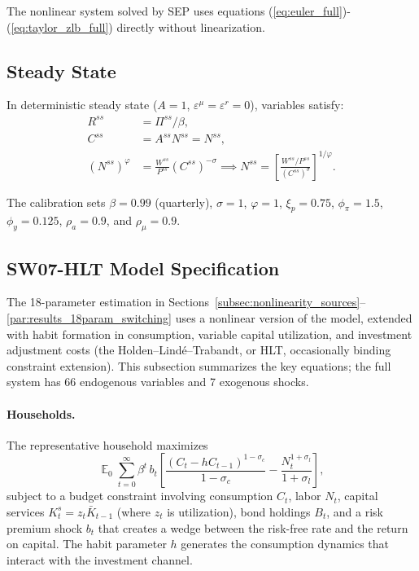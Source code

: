 \documentclass[12pt]{article}
\theoremstyle{plain}
\theoremstyle{definition}
\theoremstyle{remark}
\DeclareMathOperator{\E}{\mathbb{E}}
\newcommand{\eps}{\varepsilon}
\begin{document}
The nonlinear system solved by SEP uses equations (\ref{eq:euler_full})-(\ref{eq:taylor_zlb_full}) directly without linearization.


\subsection{Steady State}

In deterministic steady state ($A=1$, $\eps^\mu=\eps^r=0$), variables satisfy:
\begin{align}
R^{ss} &= \Pi^{ss}/\beta, \\
C^{ss} &= A^{ss} N^{ss} = N^{ss}, \\
(N^{ss})^\varphi &= \frac{W^{ss}}{P^{ss}} (C^{ss})^{-\sigma} \implies N^{ss} = \left[\frac{W^{ss}/P^{ss}}{(C^{ss})^{\sigma}}\right]^{1/\varphi}.
\end{align}

The calibration sets $\beta = 0.99$ (quarterly), $\sigma=1$, $\varphi=1$, $\xi_p=0.75$, $\phi_\pi=1.5$, $\phi_y=0.125$, $\rho_a=0.9$, and $\rho_\mu=0.9$.


\subsection{SW07-HLT Model Specification}
\label{app:sw07_model}

The 18-parameter estimation in Sections~\ref{subsec:nonlinearity_sources}--\ref{par:results_18param_switching} uses a nonlinear version of the \citet{smets2007shocks} model, extended with habit formation in consumption, variable capital utilization, and investment adjustment costs (the Holden--Lind\'e--Trabandt, or HLT, occasionally binding constraint extension). This subsection summarizes the key equations; the full system has 66 endogenous variables and 7 exogenous shocks.

\paragraph{Households.} The representative household maximizes
\[
\E_0 \sum_{t=0}^\infty \beta^t \, b_t \left[ \frac{(C_t - h C_{t-1})^{1-\sigma_c}}{1-\sigma_c} - \frac{N_t^{1+\sigma_l}}{1+\sigma_l} \right],
\]
subject to a budget constraint involving consumption $C_t$, labor $N_t$, capital services $K_t^s = z_t \bar{K}_{t-1}$ (where $z_t$ is utilization), bond holdings $B_t$, and a risk premium shock $b_t$ that creates a wedge between the risk-free rate and the return on capital. The habit parameter $h$ generates the consumption dynamics that interact with the investment channel.
\end{document}
